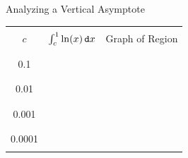 \begin{exercise}{Analyzing a Vertical Asymptote \Coffeecup \Coffeecup}
\begin{itemize}
\begin{center}
\begin{tabular}{|c|c|c|} \hline
 & & \\
\hspace{.2in} $c$ \hspace{.2in} & \hspace{.2in} $\int_c^1 \ln(x) \mathop{}\!\mathtt{d} x $ \hspace{.2in} & \hspace{.4in} Graph of Region \hspace{.4in} \\
 & & \\ \hline \hline
 & & \\
0.1 & & \\
 & & \\ \hline
  & & \\
0.01 & & \\
 & & \\ \hline
 & & \\
0.001 & & \\
 & & \\ \hline
  & & \\
0.0001 & & \\
 & & \\ \hline
\end{tabular}
\end{center}


\end{itemize}
\end{exercise}
